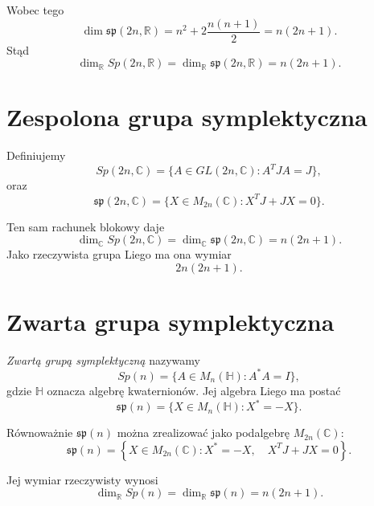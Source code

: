 Wobec tego
\[
\dim\mathfrak{sp}(2n,\mathbb R)
=
n^2
+
2\frac{n(n+1)}2
=
n(2n+1).
\]
Stąd
\[
\boxed{
\dim_{\mathbb R}Sp(2n,\mathbb R)
=
\dim_{\mathbb R}\mathfrak{sp}(2n,\mathbb R)
=
n(2n+1).
}
\]



\section{Zespolona grupa symplektyczna}


Definiujemy
\[
Sp(2n,\mathbb C)
=
\{A\in GL(2n,\mathbb C):A^TJA=J\},
\]
oraz
\[
\mathfrak{sp}(2n,\mathbb C)
=
\{X\in M_{2n}(\mathbb C):X^TJ+JX=0\}.
\]

Ten sam rachunek blokowy daje
\[
\boxed{
\dim_{\mathbb C}Sp(2n,\mathbb C)
=
\dim_{\mathbb C}\mathfrak{sp}(2n,\mathbb C)
=
n(2n+1).
}
\]
Jako rzeczywista grupa Liego ma ona wymiar
\[
2n(2n+1).
\]



\section{Zwarta grupa symplektyczna}


\begin{definicja}
\emph{Zwartą grupą symplektyczną} nazywamy
\[
Sp(n)
=
\{A\in M_n(\mathbb H):A^*A=I\},
\]
gdzie $\mathbb H$ oznacza algebrę kwaternionów.
Jej algebra Liego ma postać
\[
\mathfrak{sp}(n)
=
\{X\in M_n(\mathbb H):X^*=-X\}.
\]
\end{definicja}

Równoważnie $\mathfrak{sp}(n)$ można zrealizować jako podalgebrę
$M_{2n}(\mathbb C)$:
\[
\mathfrak{sp}(n)
=
\left\{
X\in M_{2n}(\mathbb C):
X^*=-X,\quad X^TJ+JX=0
\right\}.
\]

Jej wymiar rzeczywisty wynosi
\[
\boxed{
\dim_{\mathbb R}Sp(n)
=
\dim_{\mathbb R}\mathfrak{sp}(n)
=
n(2n+1).
}
\]

